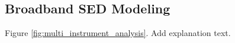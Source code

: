 \subsection{Broadband SED Modeling}
\label{ssec:broadband-sed-modeling}

Figure \ref{fig:multi_instrument_analysis}. Add explanation text.
